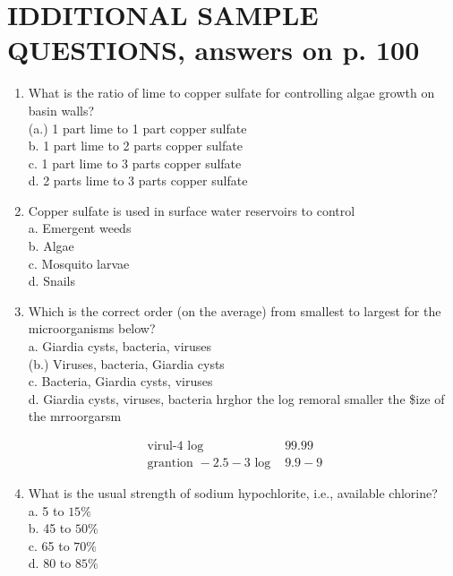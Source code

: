 \documentclass[10pt]{article}
\begin{document}
\section{IDDITIONAL SAMPLE QUESTIONS, answers on p. 100}
\begin{enumerate}
  \item What is the ratio of lime to copper sulfate for controlling algae growth on basin walls?\\
(a.) 1 part lime to 1 part copper sulfate\\
b. 1 part lime to 2 parts copper sulfate\\
c. 1 part lime to 3 parts copper sulfate\\
d. 2 parts lime to 3 parts copper sulfate

  \item Copper sulfate is used in surface water reservoirs to control\\
a. Emergent weeds\\
b. Algae\\
c. Mosquito larvae\\
d. Snails

  \item Which is the correct order (on the average) from smallest to largest for the microorganisms below?\\
a. Giardia cysts, bacteria, viruses\\
(b.) Viruses, bacteria, Giardia cysts\\
c. Bacteria, Giardia cysts, viruses\\
d. Giardia cysts, viruses, bacteria hrghor the log remoral smaller the \$ize of the mrroorgarsm

\end{enumerate}

$$
\begin{array}{ll}
\text { virul-4 log } & 99.99 \\
\text { grantion }-2.5-3 \text { log } & 9.9-9
\end{array}
$$

\begin{enumerate}
  \setcounter{enumi}{3}
  \item What is the usual strength of sodium hypochlorite, i.e., available chlorine?\\
a. 5 to $15 \%$\\
b. 45 to $50 \%$\\
c. 65 to $70 \%$\\
d. 80 to $85 \%$
\end{enumerate}
\end{document}
